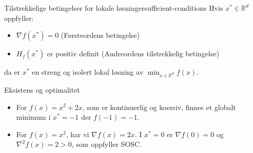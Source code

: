 \begin{theorem}{Tilstrekkelige betingelser for lokale løsninger}{sufficient-conditions}
Hvis $x^* \in \mathbb{R}^d$ oppfyller:
\begin{itemize}
    \item $\nabla f(x^*) = 0$ (Førsteordens betingelse)
    \item $H_f(x^*)$ er positiv definit (Andreordens tilstrekkelig betingelse)
\end{itemize}
da er $x^*$ en streng og isolert lokal løsning av $\min_{x \in \mathbb{R}^d} f(x)$.
\end{theorem}\label{thm:sufficient-conditions}

\begin{example}{Eksistens og optimalitet}{}
\begin{itemize}
    \item For \( f(x) = x^2 + 2x \), som er kontinuerlig og koersiv, finnes et globalt minimum i \( x^* = -1 \) der \( f(-1) = -1 \).
    \item For \( f(x) = x^2 \), har vi \( \nabla f(x) = 2x \). I \( x^* = 0 \) er \( \nabla f(0) = 0 \) og \( \nabla^2 f(x) = 2 > 0 \), som oppfyller SOSC.
\end{itemize}
\end{example}